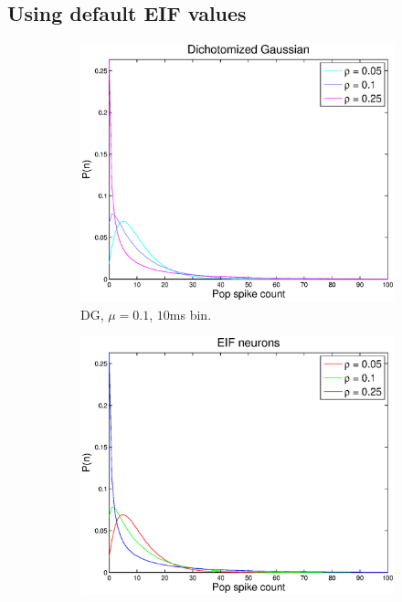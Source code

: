 \documentclass[11pt]{article}
\begin{document}
\subsection{Using default EIF values}

\begin{figure}[H]
	\begin{subfigure}[h]{0.5\textwidth}
	\centering
	\includegraphics[width=\textwidth]{../Figures/DG/DG_Macke_2a}
	\caption{\footnotesize DG, $\mu = 0.1$, $10$ms bin.}
	\label{fig1}
	\end{subfigure}
	\begin{subfigure}[h]{0.5\textwidth}
	\centering
	\includegraphics[width=\textwidth]{../Figures/EIF/EIF_Macke_2a}

\end{subfigure}
\end{figure}
\end{document}

